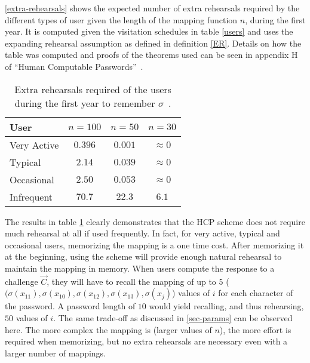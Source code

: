\autoref{extra-rehearsals} shows the expected number of extra rehearsals required by the different types of user given the length of the mapping function $n$, during the first year. It is computed given the visitation schedules in table \ref{users} and uses the expanding rehearsal assumption as defined in definition \ref{ER}. Details on how the table was computed and proofs of the theorems used can be seen in appendix H of ``Human Computable Passwords''~\cite{hcp-blocki}.

\begin{table}[ht]
    \centering
    \begin{tabular}{ |l|c|c|c| }
        \hline
        User & $n=100$ & $n=50$ & $n=30$ \\
        \hline \hline
        Very Active & $0.396$ & $0.001$ & $\approx 0$ \\
        \hline
        Typical & $2.14$ & $0.039$ & $\approx 0$ \\
        \hline
        Occasional & $2.50$ & $0.053$ & $\approx 0 $  \\
        \hline
        Infrequent & $70.7$ & $22.3$ & $6.1$ \\
        \hline

    \end{tabular}
    \caption{Extra rehearsals required of the users during the first year to remember $\sigma$~\cite{hcp-blocki}.}
    \label{extra-rehearsals}
\end{table}

\par The results in table \ref{extra-rehearsals} clearly demonstrates that the HCP scheme does not require much rehearsal at all if used frequently. In fact, for very active, typical and occasional users, memorizing the mapping is a one time cost. After memorizing it at the beginning, using the scheme will provide enough natural rehearsal to maintain the mapping in memory. 
When users compute the response to a challenge $\vec C$, they will have to recall the mapping of up to $5$ ($(\sigma(x_{11}), \sigma(x_{10}), \sigma(x_{12}), \sigma(x_{13}),\sigma(x_j)$) values of $i$ for each character of the password. A password length of $10$ would yield recalling, and thus rehearsing, $50$ values of $i$. The same trade-off as discussed in \autoref{sec-params} can be observed here. The more complex the mapping is (larger values of $n$), the more effort is required when memorizing, but no extra rehearsals are necessary even with a larger number of mappings.

